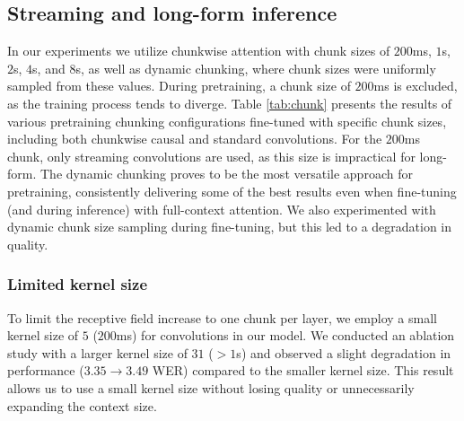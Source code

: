 \documentclass{Interspeech}
\begin{document}
\subsection{Streaming and long-form inference}

In our experiments we utilize chunkwise attention with chunk sizes of $200$ms, $1$s, $2$s, $4$s, and $8$s, as well as dynamic chunking, where chunk sizes were uniformly sampled from these values. During pretraining, a chunk size of $200$ms is excluded, as the training process tends to diverge. Table \ref{tab:chunk} presents the results of various pretraining chunking configurations fine-tuned with specific chunk sizes, including both chunkwise causal and standard convolutions. For the $200$ms chunk, only streaming convolutions are used, as this size is impractical for long-form. The dynamic chunking proves to be the most versatile approach for pretraining, consistently delivering some of the best results even when fine-tuning (and during inference) with full-context attention. We also experimented with dynamic chunk size sampling during fine-tuning, but this led to a degradation in quality.

\subsubsection{Limited kernel size}

To limit the receptive field increase to one chunk per layer, we employ a small kernel size of $5$ ($200$ms) for convolutions in our model. We conducted an ablation study with a larger kernel size of $31$ ($>1$s) and observed a slight degradation in performance ($3.35 \to 3.49$ WER) compared to the smaller kernel size. This result allows us to use a small kernel size without losing quality or unnecessarily expanding the context size.
\end{document}
